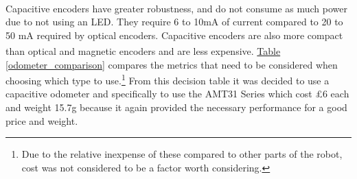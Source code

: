 \documentclass[11pt]{article}		%
\newcommand{\supercite}[1]{\textsuperscript{\cite{#1}}}		%
\newcommand{\tableref}[1]{\hyperref[#1]{Table \ref*{#1}}}     %
\newcommand{\sectref}[1]{\hyperref[#1]{Section \ref*{#1}}}     %
\begin{document}
\\ \hspace*{3ex}
Capacitive encoders have greater robustness, and do not consume as much power due to not using an LED. They require 6 to 10mA of current compared to 20 to 50 mA required by optical encoders. Capacitive encoders are also more compact than optical and magnetic encoders and are less expensive\supercite{Encoders}. \tableref{odometer_comparison} compares the metrics that need to be considered when choosing which type to use.\footnote{Due to the relative inexpense of these compared to other parts of the robot, cost was not considered to be a factor worth considering.} From this decision table it was decided to use a capacitive odometer and specifically to use the AMT31 Series which cost £6 each and weight 15.7g because it again provided the necessary performance for a good price and weight.
	        \\
	        
	        
	        
\end{document}
